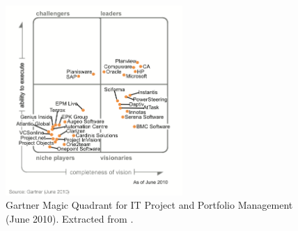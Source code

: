 \begin{figure}[h!]
\centering
\includegraphics[width=0.6\textwidth]{img/MQPPMTools.png}
\caption{Gartner Magic Quadrant for IT Project and Portfolio Management (June 2010). Extracted from \cite{magicQuadrantPPM}.}
\end{figure}


